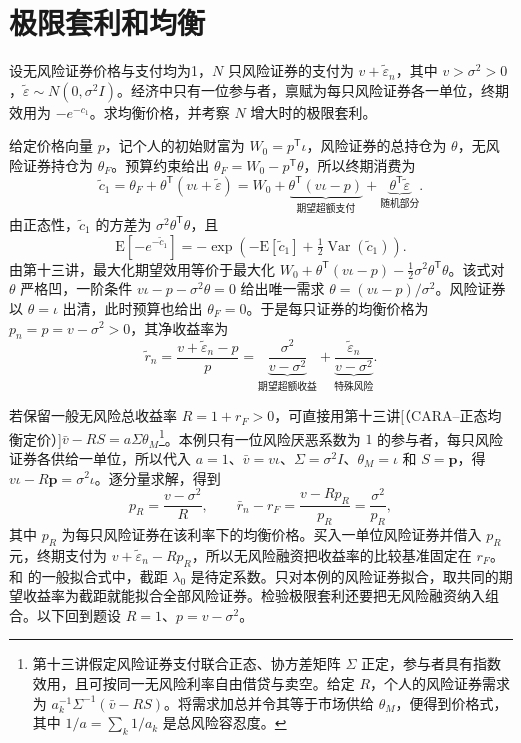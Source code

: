 \section{极限套利和均衡}\label{sec:wj-fourteen-4}
\begin{tcolorbox}[example]
\begin{question}
设无风险证券价格与支付均为1，$N$ 只风险证券的支付为 $v+\widetilde\varepsilon_n$，其中 $v>\sigma^2>0$，$\widetilde\varepsilon\sim N(0,\sigma^2I)$。经济中只有一位参与者，禀赋为每只风险证券各一单位，终期效用为 $-e^{-c_1}$。求均衡价格，并考察 $N$ 增大时的极限套利。

\end{question}
\begin{solution}[blank-type=manual,blank-vsep=5\baselineskip]
给定价格向量 $p$，记个人的初始财富为 $W_0=p^{\mathsf T}\iota$，风险证券的总持仓为 $\theta$，无风险证券持仓为 $\theta_F$。预算约束给出 $\theta_F=W_0-p^{\mathsf T}\theta$，所以终期消费为
\[
 \widetilde c_1=\theta_F+\theta^{\mathsf T}(v\iota+\widetilde\varepsilon)
 =W_0+\underbrace{\theta^{\mathsf T}(v\iota-p)}_{\text{期望超额支付}}
 +\underbrace{\theta^{\mathsf T}\widetilde\varepsilon}_{\text{随机部分}}.
\]
由正态性，$\widetilde c_1$ 的方差为 $\sigma^2\theta^{\mathsf T}\theta$，且
\[
 \mathrm E[-e^{-\widetilde c_1}]
 =-\exp\!\left(-\mathrm E[\widetilde c_1]
             +\tfrac12\operatorname{Var}(\widetilde c_1)\right).
\]
由第十三讲，最大化期望效用等价于最大化 $W_0+\theta^{\mathsf T}(v\iota-p)-\tfrac12\sigma^2\theta^{\mathsf T}\theta$。该式对 $\theta$ 严格凹，一阶条件 $v\iota-p-\sigma^2\theta=0$ 给出唯一需求 $\theta=(v\iota-p)/\sigma^2$。风险证券以 $\theta=\iota$ 出清，此时预算也给出 $\theta_F=0$。于是每只证券的均衡价格为 $p_n=p=v-\sigma^2>0$，其净收益率为
\[
 \widetilde r_n=\frac{v+\widetilde\varepsilon_n-p}{p}
 =\underbrace{\frac{\sigma^2}{v-\sigma^2}}_{\text{期望超额收益}}
 +\underbrace{\frac{\widetilde\varepsilon_n}{v-\sigma^2}}_{\text{特殊风险}}.
\]

若保留一般无风险总收益率 $R=1+r_F>0$，可直接用第十三讲[（CARA--正态均衡定价）]$\bar v-RS=a\Sigma\theta_M$\footnote{第十三讲假定风险证券支付联合正态、协方差矩阵 $\Sigma$ 正定，参与者具有指数效用，且可按同一无风险利率自由借贷与卖空。给定 $R$，个人的风险证券需求为 $a_k^{-1}\Sigma^{-1}(\bar v-RS)$。将需求加总并令其等于市场供给 $\theta_M$，便得到价格式，其中 $1/a=\sum_k1/a_k$ 是总风险容忍度。}。本例只有一位风险厌恶系数为 $1$ 的参与者，每只风险证券各供给一单位，所以代入 $a=1$、$\bar v=v\iota$、$\Sigma=\sigma^2 I$、$\theta_M=\iota$ 和 $S=\boldsymbol p$，得 $v\iota-R\boldsymbol p=\sigma^2\iota$。逐分量求解，得到
\[
 p_R=\frac{v-\sigma^2}{R},\qquad
 \bar r_n-r_F=\frac{v-Rp_R}{p_R}=\frac{\sigma^2}{p_R},
\]
其中 $p_R$ 为每只风险证券在该利率下的均衡价格。买入一单位风险证券并借入 $p_R$ 元，终期支付为 $v+\widetilde\varepsilon_n-Rp_R$，所以无风险融资把收益率的比较基准固定在 $r_F$。 和 的一般拟合式中，截距 $\lambda_0$ 是待定系数。只对本例的风险证券拟合，取共同的期望收益率为截距就能拟合全部风险证券。检验极限套利还要把无风险融资纳入组合。以下回到题设 $R=1$、$p=v-\sigma^2$。


\end{solution}
\end{tcolorbox}
